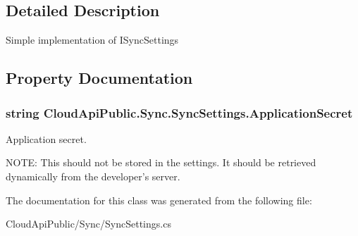 \subsection{Detailed Description}
Simple implementation of I\-Sync\-Settings 



\subsection{Property Documentation}
\hypertarget{class_cloud_api_public_1_1_sync_1_1_sync_settings_a36d55ccddfab11d848d282a99457e448}{
\subsubsection[{Application\-Secret}]{\setlength{\rightskip}{0pt plus 5cm}string Cloud\-Api\-Public.\-Sync.\-Sync\-Settings.\-Application\-Secret\hspace{0.3cm}{\ttfamily [get]}}}\label{class_cloud_api_public_1_1_sync_1_1_sync_settings_a36d55ccddfab11d848d282a99457e448}


Application secret. 

N\-O\-T\-E\-: This should not be stored in the settings. It should be retrieved dynamically from the developer's server.

The documentation for this class was generated from the following file\-:\begin{DoxyCompactItemize}
\item 
Cloud\-Api\-Public/\-Sync/Sync\-Settings.\-cs\end{DoxyCompactItemize}
